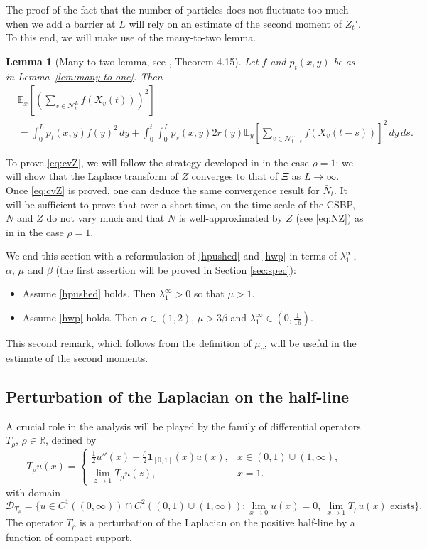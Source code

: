 \documentclass[11pt]{article}
\theoremstyle{plain}
\newtheorem{lemma}{Lemma}[section]
\newcommand\linf{\lambda_1^\infty}
\begin{document}
The proof of the fact that the number of particles does not fluctuate too much when we add a barrier at $L$ will rely on an estimate of the second moment of $Z_t'$. To this end, we will make use of the many-to-two lemma.
\begin{lemma}[Many-to-two lemma, see \cite{Ikeda:1969tj}, Theorem 4.15]
\label{lem:many-to-two}
Let $f$ and  $p_t(x,y)$ be as in Lemma~\ref{lem:many-to-one}. Then
\begin{align*}
&\mathbb{E}_x\left[\left(\sum_{v\in \mathcal N^L_t} f(X_v(t))\right)^2\right] \\
&= \int_0^L p_t(x,y) f(y)^2\,dy
+ \int_0^t \int_0^L p_s(x,y) 2r(y) \mathbb{E}_y\left[\sum_{v\in \mathcal N^L_{t-s}} f(X_v(t-s))\right]^2\,dy\,ds.
\end{align*}
\end{lemma}

To prove \eqref{eq:cvZ}, we will follow the strategy developed in \cite{Maillard:2020aa} in the case $\rho=1$: we will show that the Laplace transform of $Z$ converges to that of $\Xi $ as $L\to\infty$. Once  \eqref{eq:cvZ} is proved, one can deduce the same convergence result for $\bar{N}_t$. It will be sufficient to prove that over a short time, on the time scale of the CSBP, $\bar N$ and $Z$ do not vary much and that $\bar{N}$ is well-approximated by $Z$ (see \eqref{eq:NZ}) as in \cite[Section 4.6]{Berestycki2010} in the case $\rho=1$.  

\bigskip


We end this section with a reformulation of \eqref{hpushed} and \eqref{hwp} in terms of $\linf$, $\alpha$, $\mu$ and $\beta$ (the first assertion  will be proved in Section \ref{sec:spec}):
\begin{itemize}
\item Assume \eqref{hpushed} holds. Then $\linf>0$ so that $\mu>1.$
\item Assume \eqref{hwp} holds. Then $\alpha \in(1,2)$, $\mu>3\beta$ and $\linf\in\left(0,\frac{1}{16}\right)$.
\end{itemize}
This second remark, which follows from the definition of $\mu_c$, will be useful in the estimate of the second moments.
 

\subsection{Perturbation of the Laplacian on the half-line}\label{pt:Laplacian}

A crucial role in the analysis will be played by the family of differential operators $T_\rho$, $\rho\in\mathbb{R}$, defined by
\[
T_\rho u(x) = \begin{cases}
 \frac{1}{2} u''(x) + \frac{\rho}{2} \boldsymbol 1_{[0,1]}(x)u(x),& x\in(0,1)\cup(1,\infty),\\
 \lim_{z\to 1} T_\rho u(z),& x=1.
\end{cases}
\]
with domain 
\[
\mathcal D_{T_\rho} = \{u\in C^1((0,\infty))\cap C^2((0,1)\cup(1,\infty)): \lim_{x\to0} u(x) = 0,\ \lim_{x\to 1} T_{\rho}u(x)\text{ exists}\}.
\]
The operator $T_\rho$ is a perturbation of the Laplacian on the positive half-line by a function of compact support. 
\end{document}

